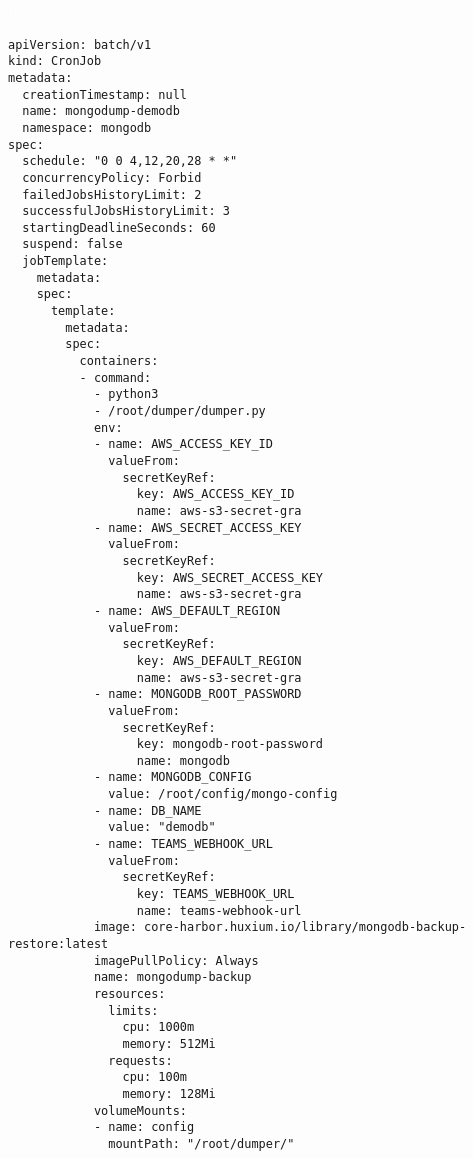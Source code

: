 \newpage
\pagestyle{empty}
\renewcommand{\thispagestyle}[1]{}
\clearpage
{}
\textcolor{white}{I}
\label{ann:annexeC}

\newenvironment{code}{\captionsetup{type=listing}}{}
\begin{code}
\begin{verbatim}
apiVersion: batch/v1
kind: CronJob
metadata:
  creationTimestamp: null
  name: mongodump-demodb
  namespace: mongodb
spec:
  schedule: "0 0 4,12,20,28 * *"
  concurrencyPolicy: Forbid
  failedJobsHistoryLimit: 2
  successfulJobsHistoryLimit: 3
  startingDeadlineSeconds: 60
  suspend: false
  jobTemplate:
    metadata:
    spec:
      template:
        metadata:
        spec:
          containers:
          - command:
            - python3
            - /root/dumper/dumper.py
            env:
            - name: AWS_ACCESS_KEY_ID
              valueFrom:
                secretKeyRef:
                  key: AWS_ACCESS_KEY_ID
                  name: aws-s3-secret-gra
            - name: AWS_SECRET_ACCESS_KEY
              valueFrom:
                secretKeyRef:
                  key: AWS_SECRET_ACCESS_KEY
                  name: aws-s3-secret-gra
            - name: AWS_DEFAULT_REGION
              valueFrom:
                secretKeyRef:
                  key: AWS_DEFAULT_REGION
                  name: aws-s3-secret-gra
            - name: MONGODB_ROOT_PASSWORD
              valueFrom:
                secretKeyRef:
                  key: mongodb-root-password
                  name: mongodb
            - name: MONGODB_CONFIG
              value: /root/config/mongo-config
            - name: DB_NAME
              value: "demodb"
            - name: TEAMS_WEBHOOK_URL
              valueFrom:
                secretKeyRef:
                  key: TEAMS_WEBHOOK_URL
                  name: teams-webhook-url
            image: core-harbor.huxium.io/library/mongodb-backup-restore:latest
            imagePullPolicy: Always
            name: mongodump-backup
            resources: 
              limits:
                cpu: 1000m
                memory: 512Mi
              requests:
                cpu: 100m
                memory: 128Mi
            volumeMounts:
            - name: config
              mountPath: "/root/dumper/"

\end{verbatim}
\end{code}
